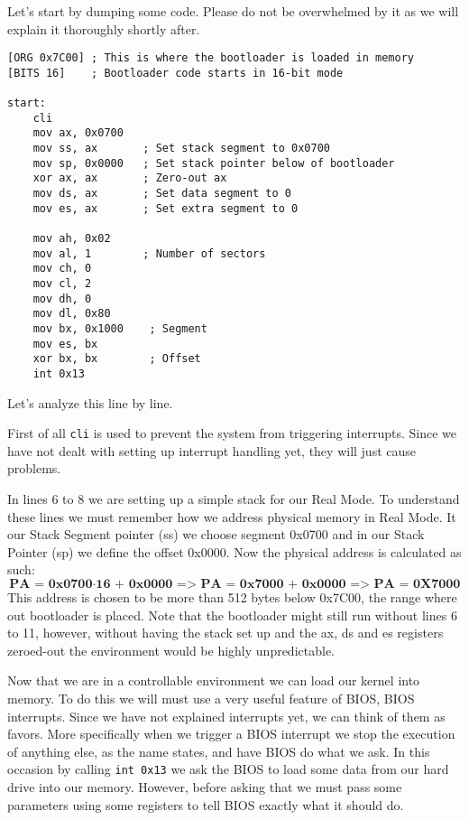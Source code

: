 Let's start by dumping some code. Please do not be overwhelmed by it as we will explain it thoroughly shortly after.

\begin{lstlisting}[caption={Simple bootloader start in assembly}]
[ORG 0x7C00] ; This is where the bootloader is loaded in memory
[BITS 16]    ; Bootloader code starts in 16-bit mode

start:
    cli
    mov ax, 0x0700
    mov ss, ax       ; Set stack segment to 0x0700
    mov sp, 0x0000   ; Set stack pointer below of bootloader
    xor ax, ax       ; Zero-out ax
    mov ds, ax       ; Set data segment to 0
    mov es, ax       ; Set extra segment to 0

    mov ah, 0x02
    mov al, 1        ; Number of sectors
    mov ch, 0
    mov cl, 2
    mov dh, 0
    mov dl, 0x80
    mov bx, 0x1000    ; Segment
    mov es, bx
    xor bx, bx        ; Offset
    int 0x13
\end{lstlisting}
    
Let's analyze this line by line. 

First of all \texttt{cli} is used to prevent the system from triggering interrupts.
Since we have not dealt with setting up interrupt handling yet, they will just cause problems.

In lines 6 to 8 we are setting up a simple stack for our Real Mode. To understand these lines we must
remember how we address physical memory in Real Mode. It our Stack Segment pointer (ss) we choose segment 0x0700
and in our Stack Pointer (sp) we define the offset 0x0000. Now the physical address is calculated as such:
\[
\textbf{PA = 0x0700} \cdot \textbf{16 + 0x0000}
\textbf{ => PA = 0x7000 + 0x0000}
\textbf{    => PA = 0X7000}
\]
This address is chosen to be more than 512 bytes below 0x7C00, the range where out bootloader is placed.
Note that the bootloader might still run without lines 6 to 11, however, without having the stack set up
and the ax, ds and es registers zeroed-out the environment would be highly unpredictable.

Now that we are in a controllable environment we can load our kernel into memory. To do this we will must use
a very useful feature of BIOS, BIOS interrupts. Since we have not explained interrupts yet, we can think of them
as favors. More specifically when we trigger a BIOS interrupt we stop the execution of anything else, as the name states,
and have BIOS do what we ask. In this occasion by calling \texttt{int 0x13} we ask the BIOS to load some data from our
hard drive into our memory. However, before asking that we must pass some parameters using some registers to tell BIOS
exactly what it should do.

